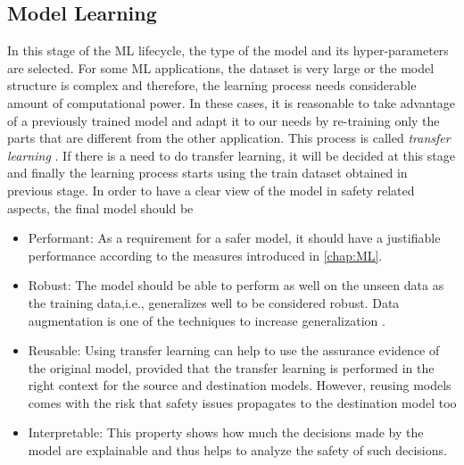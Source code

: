 \subsection{Model Learning}
In this stage of the ML lifecycle, the type of the model and its hyper-parameters are selected. For some ML applications, the dataset is very large or the model structure is complex and therefore, the learning process needs considerable amount of computational power. In these cases, it is reasonable to take advantage of a previously trained model and adapt it to our needs by re-training only the parts that are different from the other application. This process is called \textit{transfer learning} \cite{IanGoodfellow2016}. If there is a need to do transfer learning, it will be decided at this stage and finally the learning process starts using the train dataset obtained in previous stage.
In order to have a clear view of the model in safety related aspects, the final model should be \cite{Ashmore2021}  
\begin{itemize}
    \item Performant: As a requirement for a safer model, it should have a justifiable performance according to the measures introduced in \autoref{chap:ML}.
    \item Robust: The model should be able to perform as well on the unseen data as the training data,i.e., generalizes well to be considered robust. Data augmentation is one of the techniques to increase generalization \cite{Ko2015}. 
    \item Reusable: Using transfer learning can help to use the assurance evidence of the original model, provided that the transfer learning is performed in the right context for the source and destination models. However, reusing models comes with the risk that safety issues propagates to the destination model too 
    \item Interpretable: This property shows how much the decisions made by the model are explainable and thus helps to analyze the safety of such decisions. 
\end{itemize}

